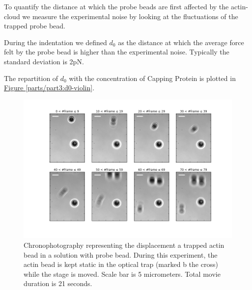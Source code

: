 \documentclass[A4paperpaper,11pt,english]{sphinxmanual}
\begin{document}
To quantify the distance at which the probe beads are first affected by the actin-cloud
we measure the experimental noise by looking at the fluctuations of the trapped probe bead.

During the indentation we defined \(d_0\) as the distance at which the
average force felt by the probe bead is higher than the experimental noise.
Typically the standard deviation is 2pN.

The repartition of \(d_0\) with the concentration of Capping Protein is
plotted in \hyperref[parts/part3:d0-violin]{Figure  \ref*{parts/part3:d0-violin}}.
\begin{figure}[htbp]
\centering
\capstart

\includegraphics[width=1.000\linewidth]{cloud-repelling.png}
\caption{Chronophotography representing the displacement a trapped actin bead in a
solution with probe bead. During this experiment, the actin bead is kept
static in the optical trap (marked b the cross) while the stage is moved.
Scale bar is 5 micrometers. Total movie duration is 21 seconds.}\label{parts/part3:cloud-repelling}\end{figure}
\end{document}
